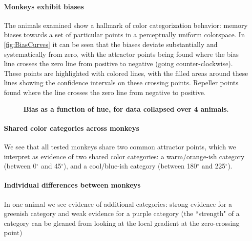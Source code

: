
\paragraph{Monkeys exhibit biases} %

The animals examined show a hallmark of color categorization behavior: memory biases towards a set of particular points in a perceptually uniform colorspace.
In \autoref{fig:BiasCurves} it can be seen that the biases deviate substantially and systematically from zero, with the attractor points being found where the bias line crosses the zero line from positive to negative (going counter-clockwise). These points are highlighted with colored lines, with the filled areas around these lines showing the confidence intervals on these crossing points. Repeller points found where the line crosses the zero line from negative to positive.

\begin{figure}

\caption{\textbf{Bias as a function of hue, for data collapsed over 4 animals.} 
}
\label{fig:BiasCurves}
\end{figure}

\paragraph{Shared color categories across monkeys}

We see that all tested monkeys share two common attractor points, which we interpret as evidence of two shared color categories: a warm/orange-ish category (between 0$^\circ$ and 45$^\circ$), and a cool/blue-ish category (between 180$^\circ$ and 225$^\circ$).

\paragraph{Individual differences between monkeys}

In one animal we see evidence of additional categories: strong evidence for a greenish category and weak evidence for a purple category (the ``strength" of a category can be gleaned from looking at the local gradient at the zero-crossing point)



